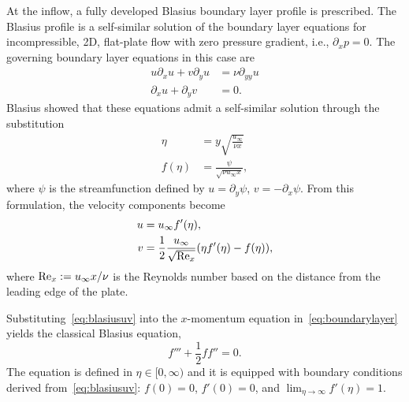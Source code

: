\documentclass[../main.tex]{subfiles}
\begin{document}
At the inflow, a fully developed Blasius boundary layer profile is prescribed. The Blasius profile is a self-similar solution of the boundary layer equations for incompressible, 2D, flat-plate flow with zero pressure gradient, i.e., $\partial_x p = 0$. The governing boundary layer equations in this case are
\begin{equation}
	\begin{aligned}
		u \partial_x u + v \partial_y u & = \nu \partial_{yy} u \\
		\partial_x u + \partial_y v                    & = 0.
	\end{aligned}
	\label{eq:boundarylayer}
\end{equation}
Blasius showed that these equations admit a self-similar solution through the substitution~\cite{blasius1908grenzschichten}
\begin{equation}
	\begin{aligned}
		\eta    & = y \sqrt{\frac{u_\infty}{\nu x}}    \\
		f(\eta) & = \frac{\psi}{\sqrt{\nu u_\infty x}},
	\end{aligned}
	\label{eq:blasius}
\end{equation}
where $\psi$ is the streamfunction defined by $u = \partial_y \psi$, $v = -\partial_x \psi$. From this formulation, the velocity components become
\begin{equation}
	\begin{aligned}
		u & = u_\infty f'(\eta),                                                    \\
		v & = \frac{1}{2} \frac{u_\infty}{\sqrt{\text{Re}_x}} (\eta f'(\eta) - f(\eta)),
	\end{aligned}
	\label{eq:blasiusuv}
\end{equation}
where $\text{Re}_x := u_\infty x / \nu$ is the Reynolds number based on the distance from the leading edge of the plate.

Substituting~\eqref{eq:blasiusuv} into the $x$-momentum equation in~\eqref{eq:boundarylayer} yields the classical Blasius equation,
\begin{equation}
	f''' + \frac{1}{2} f f'' = 0.
	\label{eq:blasiusODE}
\end{equation}
The equation is defined in $\eta \in[0,\infty)$ and it is equipped with boundary conditions derived from~\eqref{eq:blasiusuv}: $f(0) = 0$, $f'(0) = 0$, and $\lim_{\eta\to\infty} f'(\eta) = 1$.
\end{document}
